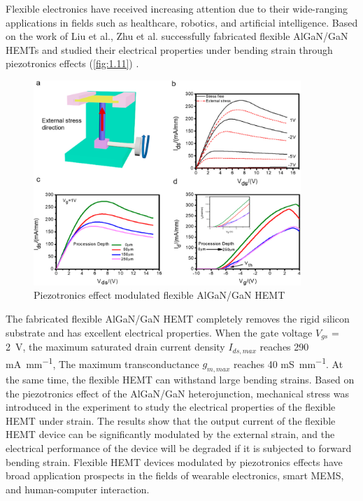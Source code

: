 Flexible electronics have received increasing attention due to their wide-ranging applications in fields such as healthcare, robotics, and artificial intelligence. Based on the work of Liu et al., Zhu et al. successfully fabricated flexible AlGaN/GaN HEMTs  and studied their electrical properties under bending strain  through piezotronics  effects (\autoref{fig:1.11}) \cite{zhu2019piezotronic,zhu2020thesis}. 

\begin{figure}[H] 
\centering    
\includegraphics[width=0.9\textwidth]{ch1_11}
\caption[Piezotronics effect modulated flexible AlGaN/GaN HEMT]{Piezotronics effect modulated flexible AlGaN/GaN HEMT \protect\cite{zhu2019piezotronic}}
\label{fig:1.11}
\end{figure}

\noindent The fabricated flexible AlGaN/GaN HEMT  completely removes the rigid silicon substrate  and has excellent electrical properties. When the gate voltage  $V_{gs}$ = \SI{2}{\volt}, the maximum saturated drain current  density $I_{ds,max}$ reaches 290 \unit{\mA\per\mm}, The maximum transconductance  $g_{m, max}$ reaches 40 \unit{\milli\siemens\per\mm}. At the same time, the flexible HEMT can withstand large bending  strains. Based on the piezotronics  effect of the AlGaN/GaN heterojunction, mechanical stress was introduced in the experiment to study the electrical properties of the flexible HEMT under strain. The results show that the output current  of the flexible HEMT  device can be significantly modulated  by the external strain, and the electrical performance of the device will be degraded  if it is subjected to forward bending  strain. Flexible HEMT devices modulated by piezotronics effects  have broad application prospects in the fields of wearable electronics, smart  MEMS, and human-computer interaction.


